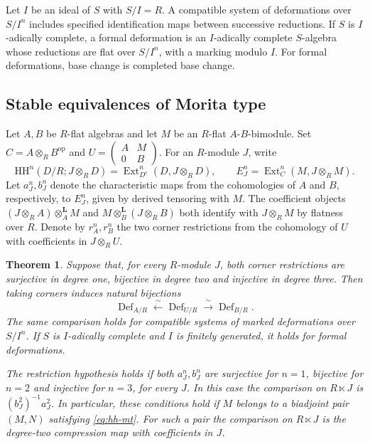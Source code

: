\documentclass[12pt,a4paper,english,reqno]{amsart}
\numberwithin{equation}{section}
\theoremstyle{plain}
\newtheorem{theorem}{Theorem}[section]
\theoremstyle{definition}
\begin{document}
Let $I$ be an ideal of $S$ with $S/I=R$. A compatible system of
deformations over $S/I^n$ includes specified identification maps
between successive reductions. If $S$ is $I$-adically complete,
a formal deformation is an $I$-adically complete $S$-algebra
whose reductions are flat over $S/I^n$, with a marking modulo
$I$. For formal deformations, base change is completed base change.

\subsection{Stable equivalences of Morita type}

Let $A,B$ be $R$-flat algebras and let $M$ be an $R$-flat
$A$-$B$-bimodule. Set $C=A\otimes_R B^{\mathrm{op}}$ and
$U=\left(\begin{smallmatrix}A&M\\0&B\end{smallmatrix}\right)$.
For an $R$-module $J$, write
\[
 \mathrm{HH}^{n}(D/R;J\otimes_R D)
   =\operatorname{Ext}_{D^e}^{n}(D,J\otimes_R D),
 \qquad E_J^n=\operatorname{Ext}_{C}^{n}(M,J\otimes_R M).
\]
Let $a_J^n,b_J^n$ denote the characteristic maps from the
cohomologies of $A$ and $B$, respectively, to $E_J^n$, given
by derived tensoring with $M$. The coefficient objects
$(J\otimes_R A)\otimes_A^{\mathbf L}M$ and
$M\otimes_B^{\mathbf L}(J\otimes_R B)$ both identify with
$J\otimes_R M$ by flatness over $R$. Denote
by $r_A^n,r_B^n$ the two corner restrictions from the cohomology
of $U$ with coefficients in $J\otimes_R U$.

\begin{theorem}\label{thm:stable-associative-deformations}
Suppose that, for every $R$-module $J$, both corner restrictions
are surjective in degree one, bijective in degree two and
injective in degree three. Then taking corners induces natural
bijections
\[
 \operatorname{Def}_{A/R}
  \xleftarrow{\ \sim\ }\operatorname{Def}_{U/R}
  \xrightarrow{\ \sim\ }\operatorname{Def}_{B/R}.
\]
The same comparison holds for compatible systems of marked
deformations over $S/I^n$. If $S$ is $I$-adically complete
and $I$ is finitely generated, it holds for formal deformations.

The restriction hypothesis holds if both $a_J^n,b_J^n$ are
surjective for $n=1$, bijective for $n=2$ and injective for
$n=3$, for every $J$. In this case the comparison on
$R\ltimes J$ is $(b_J^2)^{-1}a_J^2$. In particular, these
conditions hold if $M$ belongs to a biadjoint pair $(M,N)$
satisfying \eqref{eq:hh-mt}. For such a pair the comparison
on $R\ltimes J$ is the degree-two compression map with
coefficients in $J$.
\end{theorem}
\end{document}
